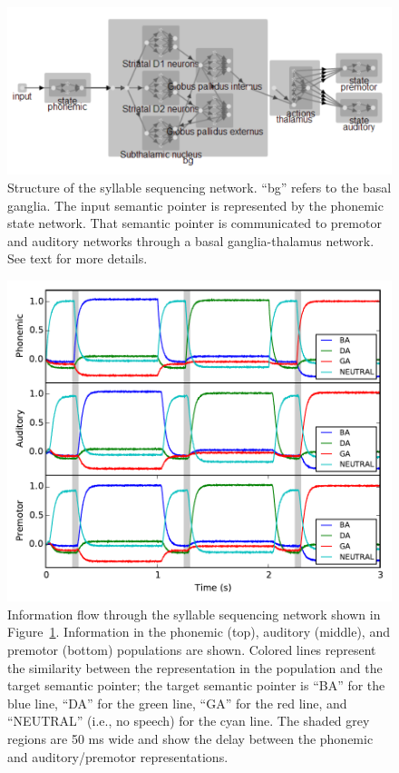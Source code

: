 \documentclass[conference]{IEEEtran}
\begin{document}
\begin{figure}
\centering
\includegraphics[width=\columnwidth]{ipynb551_structure}
\caption{Structure of the syllable sequencing network. ``bg''
  refers to the basal ganglia. The input semantic pointer is
  represented by the phonemic state network.
  That semantic pointer is communicated to premotor and auditory
  networks through a basal ganglia-thalamus network. See text
  for more details.}
\label{fig:ipynb551_structure}
\end{figure}

\begin{figure}
\centering
\includegraphics[width=\columnwidth]{ipynb551_output}
\caption{Information flow through the syllable sequencing
  network shown in Figure~\ref{fig:ipynb551_structure}.
  Information in the phonemic (top), auditory (middle),
  and premotor (bottom) populations are shown.
  Colored lines represent the similarity between the
  representation in the population and the target semantic pointer;
  the target semantic pointer is ``BA'' for the blue line,
  ``DA'' for the green line, ``GA'' for the red line,
  and ``NEUTRAL'' (i.e., no speech) for the cyan line.
  The shaded grey regions are 50 ms wide and show the delay
  between the phonemic and auditory/premotor representations.}
\label{fig:ipynb551_output}
\end{figure}
\end{document}
